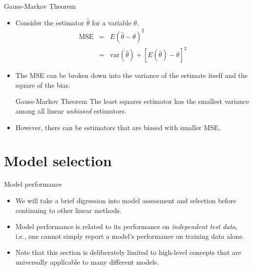 \documentclass[aspectratio=169]{beamer}
\begin{document}
\begin{frame}{Gauss-Markov Theorem}
    \begin{itemize}
        \item Consider the estimator $\hat{\theta}$ for a variable $\theta$.
        \begin{eqnarray*}
            \mathrm{MSE} & = & E(\hat{\theta} - \theta)^2 \\
            & = & \mathrm{var}(\hat{\theta}) + [E(\hat{\theta}) - \theta]^2
        \end{eqnarray*}
        \item The MSE can be broken down into the variance of the estimate itself and the square of the bias.
        \begin{block}{Gauss-Markov Theorem}
        The least squares estimator has the smallest variance among all linear \textit{unbiased} estimators.
        \end{block}
        \item However, there can be estimators that are biased with smaller MSE.
    \end{itemize}
\end{frame}



\section{Model selection}


\begin{frame}{Model performance}
    \begin{itemize}
        \item We will take a brief digression into model assessment and selection before continuing to other linear methods.
        \item Model performance is related to its performance on \textit{independent test data}, i.e., one cannot simply report a model's performance on training data alone.
        \item Note that this section is deliberately limited to high-level concepts that are universally applicable to many different models.
    \end{itemize}
\end{frame}
\end{document}
